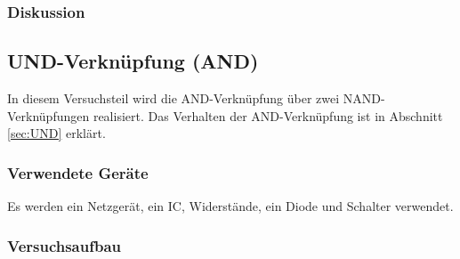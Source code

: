 \documentclass[12pt,a4paper]{article}
\begin{document}
\subsubsection*{Diskussion}

\subsection{UND-Verknüpfung (AND)}

In diesem Versuchsteil wird die AND-Verknüpfung über zwei NAND-Verknüpfungen realisiert. Das Verhalten der AND-Verknüpfung ist in Abschnitt \ref{sec:UND} erklärt.

\subsubsection*{Verwendete Geräte}

Es werden ein Netzgerät, ein IC, Widerstände, ein Diode und Schalter verwendet.


\subsubsection*{Versuchsaufbau}
\end{document}
